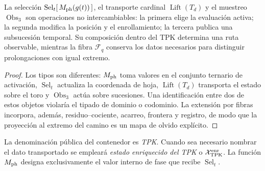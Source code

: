 \begin{proposition}
\label{prop:tpk-separacion-operadores-rev11}
La selección \(\operatorname{Sel}_t[\,M_{\rm ph}(g(t))\,]\), el transporte
cardinal \(\operatorname{Lift}(T_d)\) y el muestreo
\(\operatorname{Obs}_3\) son operaciones no intercambiables: la primera elige
la evaluación activa; la segunda modifica la posición y el enrollamiento; la
tercera publica una subsucesión temporal. Su composición dentro del TPK
determina una ruta observable, mientras la fibra \(\mathcal F_q\) conserva
los datos necesarios para distinguir prolongaciones con igual extremo.
\end{proposition}

\begin{proof}
Los tipos son diferentes: \(M_{\rm ph}\) toma valores en el conjunto ternario
de activación, \(\operatorname{Sel}_t\) actualiza la coordenada de hoja,
\(\operatorname{Lift}(T_d)\) transporta el estado sobre el toro y
\(\operatorname{Obs}_3\) actúa sobre sucesiones. Una identificación entre dos
de estos objetos violaría el tipado de dominio o codominio. La extensión por fibras
incorpora, además, residuo--cociente, acarreo, frontera y registro, de modo
que la proyección al extremo del camino es un mapa de olvido explícito.
\end{proof}

\begin{statusbox}[title={Nomenclatura canónica}]
La denominación pública del contenedor es \emph{TPK}. Cuando sea necesario
nombrar el dato transportado se empleará \emph{estado enriquecido del TPK} o
\(\mathcal X_{\rm TPK}^{\rm enr}\). La función \(M_{\rm ph}\) designa
exclusivamente el valor interno de fase que recibe
\(\operatorname{Sel}_t\).
\end{statusbox}

